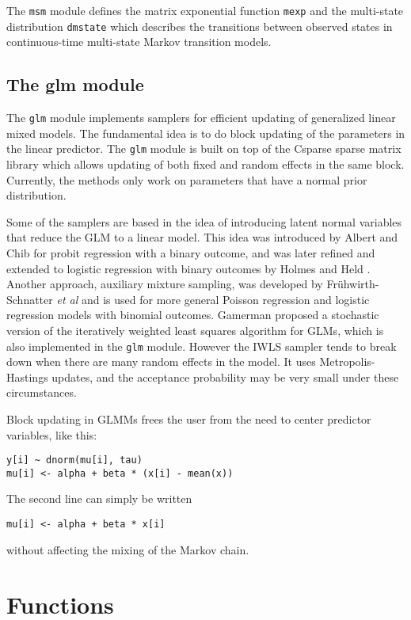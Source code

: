 \documentclass[11pt, a4paper, titlepage]{report}
\begin{document}
The \verb+msm+ module defines the matrix exponential function
\verb+mexp+ and the multi-state distribution \verb+dmstate+ which
describes the transitions between observed states in continuous-time
multi-state Markov transition models. 

\section{The glm module}

The \verb+glm+ module implements samplers for efficient updating of
generalized linear mixed models.  The fundamental idea is to do block
updating of the parameters in the linear predictor.  The \verb+glm+
module is built on top of the \textsf{Csparse} sparse matrix library
\cite{Davis2006} which allows updating of both fixed and random
effects in the same block. Currently, the methods only work on
parameters that have a normal prior distribution.

Some of the samplers are based in the idea of introducing latent
normal variables that reduce the GLM to a linear model. This idea was
introduced by Albert and Chib \cite{AlbertChib93} for probit
regression with a binary outcome, and was later refined and extended
to logistic regression with binary outcomes by Holmes and Held
\cite{HolmesHeld06}. Another approach, auxiliary mixture sampling,
was developed by Fr{\"u}hwirth-Schnatter {\em et al}
\cite{Fruhwirth-Schnatter09} and is used for more general Poisson
regression and logistic regression models with binomial outcomes.
Gamerman \cite{Gamerman97} proposed a stochastic version of the iteratively
weighted least squares algorithm for GLMs, which is also implemented
in the \verb+glm+ module. However the IWLS sampler tends to break down
when there are many random effects in the model. It uses
Metropolis-Hastings updates, and the acceptance probability may be
very small under these circumstances.

Block updating in GLMMs frees the user from the need to center
predictor variables, like this:
\begin{verbatim}
y[i] ~ dnorm(mu[i], tau)
mu[i] <- alpha + beta * (x[i] - mean(x))
\end{verbatim}
The second line can simply be written
\begin{verbatim}
mu[i] <- alpha + beta * x[i]
\end{verbatim}
without affecting the mixing of the Markov chain.  

\chapter{Functions}
\label{section:functions}
\end{document}
